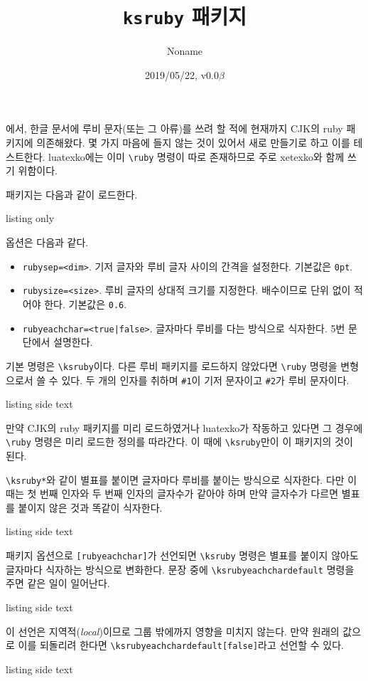 \documentclass[a4paper]{oblivoir}
\def\pkg#1{\textsf{#1}}
\begin{document}
\title{\texttt{ksruby} 패키지}
\author{Noname}
\date{2019/05/22, v0.0$\beta$}

\maketitle
\firmlists

\numpar 
\XeLaTeX 에서, 한글 문서에 루비 문자(또는 그 아류)를 쓰려 할 적에 현재까지 CJK의 \pkg{ruby} 패키지에 의존해왔다. 몇 가지 마음에 들지 않는 것이 있어서 새로 만들기로 하고 이를 테스트한다. \pkg{luatexko}에는 이미 \verb|\ruby| 명령이 따로 존재하므로 주로 \pkg{xetexko}와 함께 쓰기 위함이다.

\numpar
패키지는 다음과 같이 로드한다.
\begin{tcblisting}{listing only}
\usepackage[<options>]{ksruby}
\end{tcblisting}
옵션은 다음과 같다.
\begin{itemize}
\item \texttt{rubysep=<dim>}. 기저 글자와 루비 글자 사이의 간격을 설정한다. 기본값은 \texttt{0pt}.
\item \texttt{rubysize=<size>}. 루비 글자의 상대적 크기를 지정한다. 배수이므로 단위 없이 적어야 한다. 기본값은  \texttt{0.6}.
\item \texttt{rubyeachchar=<true|false>}. 글자마다 루비를 다는 방식으로 식자한다. 5번 문단에서 설명한다.
\end{itemize}

\numpar
기본 명령은 \verb|\ksruby|이다. 다른 루비 패키지를 로드하지 않았다면 \verb|\ruby| 명령을 변형으로서 쓸 수 있다.
두 개의 인자를 취하며 \verb|#1|이 기저 문자이고 \verb|#2|가 루비 문자이다.
\begin{tcblisting}{listing side text}
\end{tcblisting}
만약 CJK의 \pkg{ruby} 패키지를 미리 로드하였거나 \pkg{luatexko}가 작동하고 있다면 그 경우에 \verb|\ruby| 명령은 미리 로드한 정의를 따라간다. 이 때에 \verb|\ksruby|만이 이 패키지의 것이 된다.

\numpar
\verb|\ksruby*|와 같이 별표를 붙이면 글자마다 루비를 붙이는 방식으로 식자한다. 다만 이 때는 첫 번째 인자와 두 번째 인자의 글자수가 같아야 하며 만약 글자수가 다르면 별표를 붙이지 않은 것과 똑같이 식자한다.
\begin{tcblisting}{listing side text}
\end{tcblisting}

\numpar 
패키지 옵션으로 \verb|[rubyeachchar]|가 선언되면 \verb|\ksruby| 명령은 별표를 붙이지 않아도 글자마다 식자하는 방식으로 변화한다.
문장 중에 \verb|\ksrubyeachchardefault| 명령을 주면 같은 일이 일어난다.
\begin{tcblisting}{listing side text}
\ksrubyeachchardefault
{}
\end{tcblisting}
이 선언은 지역적(\emph{local})이므로 그룹 밖에까지 영향을 미치지 않는다. 만약 원래의 값으로 이를 되돌리려 한다면 \verb|\ksrubyeachchardefault[false]|라고 선언할 수 있다.
\begin{tcblisting}{listing side text}
\ksrubyeachchardefault[false]
\end{tcblisting}
\end{document}
